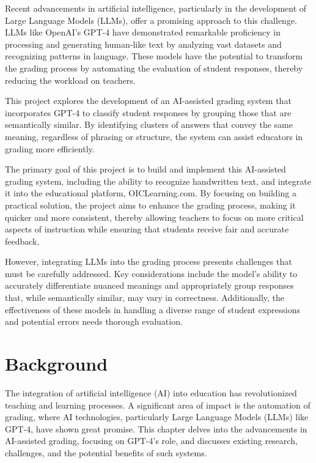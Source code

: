 \documentclass[ms,twoside,print]{nuthesis}
\begin{document}
Recent advancements in artificial intelligence, particularly in the development of Large Language Models (LLMs), offer a promising approach to this challenge. LLMs like OpenAI's GPT-4 have demonstrated remarkable proficiency in processing and generating human-like text by analyzing vast datasets and recognizing patterns in language. These models have the potential to transform the grading process by automating the evaluation of student responses, thereby reducing the workload on teachers.

This project explores the development of an AI-assisted grading system that incorporates GPT-4 to classify student responses by grouping those that are semantically similar. By identifying clusters of answers that convey the same meaning, regardless of phrasing or structure, the system can assist educators in grading more efficiently.

The primary goal of this project is to build and implement this AI-assisted grading system, including the ability to recognize handwritten text, and integrate it into the educational platform, OICLearning.com. By focusing on building a practical solution, the project aims to enhance the grading process, making it quicker and more consistent, thereby allowing teachers to focus on more critical aspects of instruction while ensuring that students receive fair and accurate feedback.

However, integrating LLMs into the grading process presents challenges that must be carefully addressed. Key considerations include the model's ability to accurately differentiate nuanced meanings and appropriately group responses that, while semantically similar, may vary in correctness. Additionally, the effectiveness of these models in handling a diverse range of student expressions and potential errors needs thorough evaluation.

\chapter{Background}

The integration of artificial intelligence (AI) into education has revolutionized teaching and learning processes. A significant area of impact is the automation of grading, where AI technologies, particularly Large Language Models (LLMs) like GPT-4, have shown great promise. This chapter delves into the advancements in AI-assisted grading, focusing on GPT-4's role, and discusses existing research, challenges, and the potential benefits of such systems.
\end{document}
